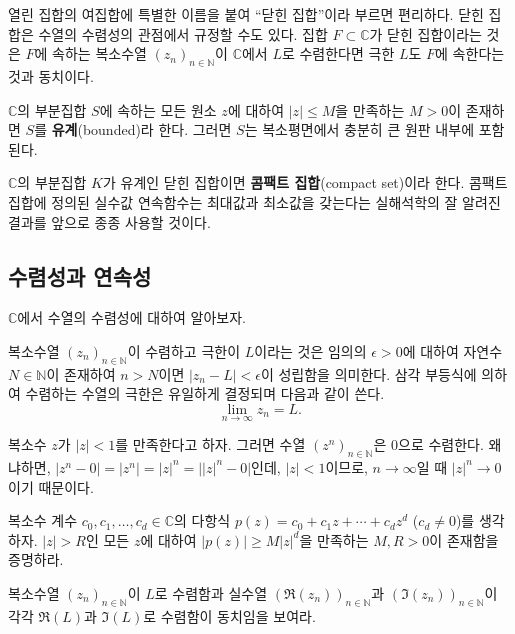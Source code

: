 열린 집합의 여집합에 특별한 이름을 붙여 ``닫힌 집합''이라 부르면 편리하다.
닫힌 집합은 수열의 수렴성의 관점에서 규정할 수도 있다.
집합 $F\subset \mathbb C$가 닫힌 집합이라는 것은
$F$에 속하는 복소수열 $(z_n)_{n\in\mathbb N}$이  $\mathbb C$에서 $L$로 수렴한다면
극한 $L$도 $F$에 속한다는 것과 동치이다.

$\mathbb C$의 부분집합 $S$에 속하는 모든 원소 $z$에 대하여
$|z|\le M$을 만족하는 $M>0$이 존재하면 $S$를 {\bf 유계}(bounded)라 한다.
그러면 $S$는 복소평면에서 충분히 큰 원판 내부에 포함된다.

$\mathbb C$의 부분집합 $K$가 유계인 닫힌 집합이면 {\bf 콤팩트 집합}(compact set)이라 한다.
콤팩트 집합에 정의된 실수값 연속함수는 최대값과 최소값을 갖는다는
실해석학의 잘 알려진 결과를
앞으로 종종 사용할 것이다.

\subsection{수렴성과 연속성}

$\mathbb C$에서 수열의 수렴성에 대하여 알아보자.
 
복소수열 $(z_n)_{n\in\mathbb N}$이 수렴하고 극한이 $L$이라는 것은
임의의 $\epsilon>0$에 대하여 자연수 $N\in\mathbb N$이 존재하여
 $n>N$이면 $|z_n -L| < \epsilon$이 성립함을 의미한다.
삼각 부등식에 의하여 수렴하는 수열의 극한은 유일하게 결정되며
다음과 같이 쓴다.
$$
\lim_{n\to\infty} z_n = L.
$$

\begin{saltexample}[label=example-1-1]{}{}
복소수 $z$가 $|z|<1$를 만족한다고 하자.
그러면 수열 $(z^n)_{n\in\mathbb N}$은 $0$으로 수렴한다.
왜냐하면, $|z^n-0| = |z^n| = |z|^n = \big||z|^n-0\big|$인데,
$|z|<1$이므로, $n\to\infty$일 때 $|z|^n\to0$이기 때문이다.
\end{saltexample}

\begin{salt_exercise} \label{ex-1-24}
복소수 계수 $c_0, c_1, \ldots, c_d\in \mathbb C$의
다항식 $p(z)=c_0 + c_1z + \cdots + c_dz^d$ ($c_d\ne0$)를 생각하자.
$|z|>R$인 모든 $z$에 대하여 $|p(z)| \ge M|z|^d$을 만족하는
$M, R>0$이 존재함을 증명하라.
\end{salt_exercise}

\begin{salt_exercise} \label{ex-1-25}
복소수열 $(z_n)_{n\in\mathbb N}$이 $L$로 수렴함과
실수열 $(\Re(z_n))_{n\in\mathbb N}$과  $(\Im(z_n))_{n\in\mathbb N}$이
각각 $\Re(L)$과 $\Im(L)$로 수렴함이 동치임을 보여라.
\end{salt_exercise}

